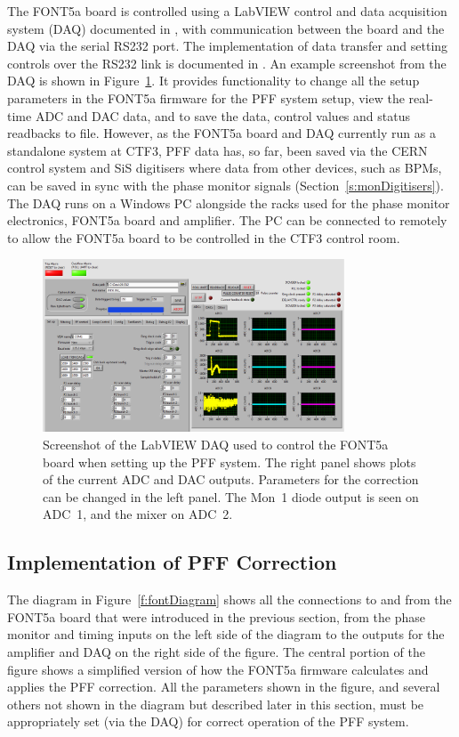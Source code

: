 The FONT5a board is controlled using a LabVIEW control and data acquisition system (DAQ) documented in \cite{dougThesis}, with communication between the board and the DAQ via the serial RS232 port. The implementation of data transfer and setting controls over the RS232 link is documented in \cite{benThesis}. An example screenshot from the DAQ is shown in Figure~\ref{f:DAQScreenshot}. It provides functionality to change all the setup parameters in the FONT5a firmware for the PFF system setup, view the real-time ADC and DAC data, and to save the data, control values and status readbacks to file. However, as the FONT5a board and DAQ currently run as a standalone system at CTF3, PFF data has, so far, been saved via the CERN control system and SiS digitisers where data from other devices, such as BPMs, can be saved in sync with the phase monitor signals (Section~\ref{s:monDigitisers}). The DAQ runs on a Windows PC alongside the racks used for the phase monitor electronics, FONT5a board and amplifier. The PC can be connected to remotely to allow the FONT5a board to be controlled in the CTF3 control room.

\begin{figure}
  \centering
  \includegraphics[width=0.8\textwidth]{Figures/commissioning/DAQScreenshot}
  \caption{Screenshot of the LabVIEW DAQ used to control the FONT5a board when setting up the PFF system. The right panel shows plots of the current ADC and DAC outputs. Parameters for the correction can be changed in the left panel. The Mon~1 diode output is seen on ADC~1, and the mixer on ADC~2.}
  \label{f:DAQScreenshot}
\end{figure}

\subsection{Implementation of PFF Correction}
\label{ss:pffFirmware}

The diagram in Figure~\ref{f:fontDiagram} shows all the connections to and from the FONT5a board that were introduced in the previous section, from the phase monitor and timing inputs on the left side of the diagram to the outputs for the amplifier and DAQ on the right side of the figure. The central portion of the figure shows a simplified version of how the FONT5a firmware calculates and applies the PFF correction. All the parameters shown in the figure, and several others not shown in the diagram but described later in this section, must be appropriately set (via the DAQ) for correct operation of the PFF system.

